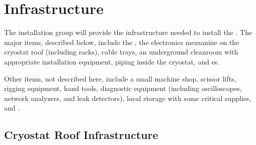 \section{Infrastructure}
\label{sec:fdsp-tc-infr}





The  installation group will provide the infrastructure needed to install the . The major items, described below, include the , the electronics mezzanine on the cryostat roof (including racks), cable trays, an underground cleanroom with appropriate installation equipment, piping inside the cryostat, and \coldbox{}es. 

Other items, not described here, include a small machine shop, scissor lifts, rigging equipment, hand tools, diagnostic equipment (including oscilloscopes, network analyzers, and leak detectors), local storage with some critical supplies, and .  



\subsection{Cryostat Roof Infrastructure}
\label{sec:fdsp-tc-infr-cryo-roof}



